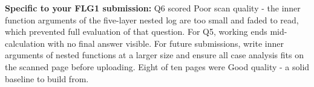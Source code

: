 \documentclass[11pt,a4paper]{article}
\begin{document}
\par\vspace{0.4cm}
\noindent\textbf{Specific to your FLG1 submission:} Q6 scored Poor scan quality - the inner function arguments of the five-layer nested log are too small and faded to read, which prevented full evaluation of that question. For Q5, working ends mid-calculation with no final answer visible. For future submissions, write inner arguments of nested functions at a larger size and ensure all case analysis fits on the scanned page before uploading. Eight of ten pages were Good quality - a solid baseline to build from.
\end{document}
